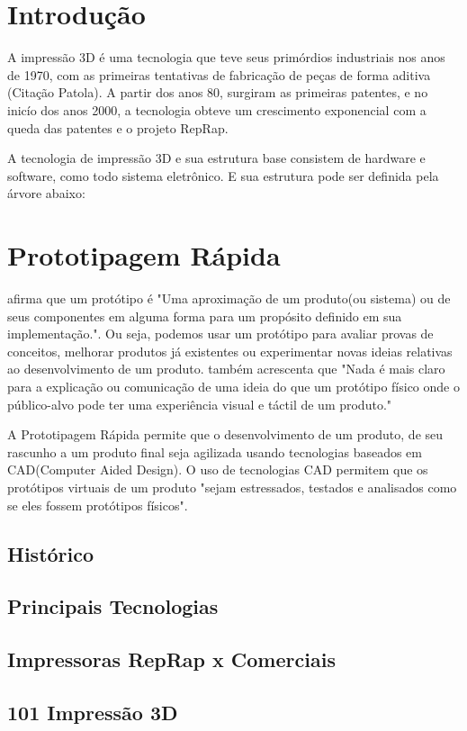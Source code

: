 \section{Introdução}
A impressão 3D é uma tecnologia que teve seus primórdios industriais nos anos de 1970,
com as primeiras tentativas de fabricação de peças de forma aditiva (Citação Patola).
A partir dos anos 80, surgiram as primeiras patentes, e no inicío dos anos 2000,
a tecnologia obteve um crescimento exponencial com a queda das patentes e o projeto RepRap.

A tecnologia de impressão 3D e sua estrutura base consistem de hardware e software,
como todo sistema eletrônico. E sua estrutura pode ser definida pela árvore abaixo:
\newline



\newpage

\section{Prototipagem Rápida}
\citet{rapidproto} afirma que um protótipo é "Uma aproximação de um produto(ou sistema)
ou de seus componentes em alguma forma para um propósito definido em sua implementação.".
Ou seja, podemos usar um protótipo para avaliar provas de conceitos, melhorar produtos
já existentes ou experimentar novas ideias relativas ao desenvolvimento de um produto.
\citet{rapidproto} também acrescenta que "Nada é mais claro para a explicação ou comunicação
de uma ideia do que um protótipo físico onde o público-alvo pode ter uma experiência visual
e táctil de um produto."

A Prototipagem Rápida permite que o desenvolvimento de um produto, de seu rascunho
a um produto final seja agilizada usando tecnologias baseados em CAD(Computer Aided Design).
O uso de tecnologias CAD permitem que os protótipos virtuais de um produto
\citet{rapidproto} "sejam estressados, testados e analisados como se eles fossem protótipos físicos".

\subsection{Histórico}
\subsection{Principais Tecnologias}
\subsection{Impressoras RepRap x Comerciais}
\subsection{101 Impressão 3D}

